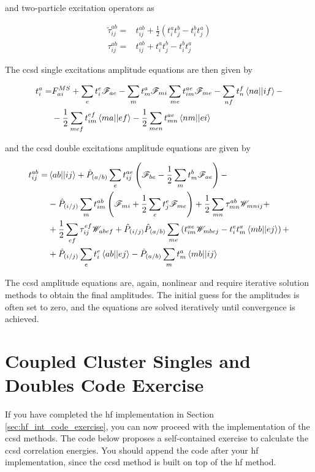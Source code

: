 and two-particle excitation operators as

\begin{align}
\tilde{\tau}_{ij}^{ab}=&t_{ij}^{ab}+\frac{1}{2}\left(t_i^at_j^b-t_i^bt_j^a\right) \\
\tau_{ij}^{ab}=&t_{ij}^{ab}+t_i^at_j^b-t_i^bt_j^a
\end{align}

The \acrshort{ccsd} single excitations amplitude equations are then given by

\begin{align}
t_i^a=&F_{ai}^{MS}+\sum_et_i^e\mathscr{F}_{ae}-\sum_mt_m^a\mathscr{F}_{mi}\sum_{me}t_{im}^{ae}\mathscr{F}_{me}-\sum_{nf}t_n^f\braket{na||if}-\nonumber \\
&-\frac{1}{2}\sum_{mef}t_{im}^{ef}\braket{ma||ef}-\frac{1}{2}\sum_{men}t_{mn}^{ae}\braket{nm||ei}
\end{align}

and the \acrshort{ccsd} double excitations amplitude equations are given by

\begin{align}
t_{ij}^{ab}=&\braket{ab||ij}+\hat{P}_{(a/b)}\sum_et_{ij}^{ae}\left(\mathscr{F}_{be}-\frac{1}{2}\sum_mt_m^b\mathscr{F}_{ae}\right)-\nonumber \\
&-\hat{P}_{(i/j)}\sum_mt_{im}^{ab}\left(\mathscr{F}_{mi}+\frac{1}{2}\sum_et_j^e\mathscr{F}_{me}\right)+\frac{1}{2}\sum_{mn}\tau_{mn}^{ab}\mathscr{W}_{mnij}+\nonumber \\
&+\frac{1}{2}\sum_{ef}\tau_{ij}^{ef}\mathscr{W}_{abef}+\hat{P}_{(i/j)}\hat{P}_{(a/b)}\sum_{me}\left(t_{im}^{ae}\mathscr{W}_{mbej}-t_i^et_m^a\braket{mb||ej}\right)+\nonumber \\
&+\hat{P}_{(i/j)}\sum_et_i^e\braket{ab||ej}-\hat{P}_{(a/b)}\sum_mt_m^a\braket{mb||ij}
\end{align}

The \acrshort{ccsd} amplitude equations are, again, nonlinear and require iterative solution methods to obtain the final amplitudes. The initial guess for the amplitudes is often set to zero, and the equations are solved iteratively until convergence is achieved.

\section{Coupled Cluster Singles and Doubles Code Exercise}

If you have completed the \acrshort{hf} implementation in Section \ref{sec:hf_int_code_exercise}, you can now proceed with the implementation of the \acrshort{ccsd} methods. The code below proposes a self-contained exercise to calculate the \acrshort{ccsd} correlation energies. You should append the code after your \acrshort{hf} implementation, since the \acrshort{ccsd} method is built on top of the \acrshort{hf} method.

